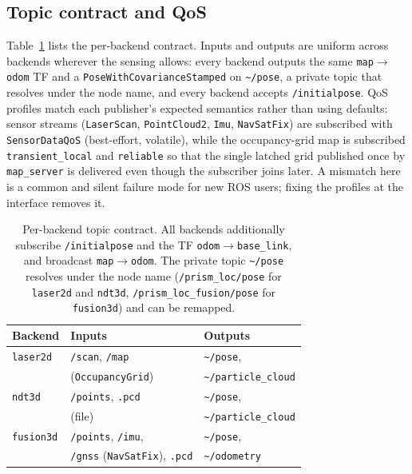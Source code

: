 \subsection{Topic contract and QoS}
Table~\ref{tab:contract} lists the per-backend contract. Inputs and
outputs are uniform across backends wherever the sensing allows: every
backend outputs the same \texttt{map}$\to$\texttt{odom} TF and a
\texttt{PoseWithCovarianceStamped} on \texttt{\textasciitilde/pose}, a
private topic that resolves under the node name, and every backend
accepts \texttt{/initialpose}. QoS profiles match
each publisher's expected semantics rather than using defaults: sensor
streams (\texttt{LaserScan}, \texttt{PointCloud2}, \texttt{Imu},
\texttt{NavSatFix}) are subscribed with \texttt{SensorDataQoS}
(best-effort, volatile), while the occupancy-grid map is subscribed
\texttt{transient\_local} and \texttt{reliable} so that the single
latched grid published once by \texttt{map\_server} is delivered even
though the subscriber joins later. A mismatch here is a common and
silent failure mode for new ROS users; fixing the profiles at the
interface removes it.

\begin{table}[t]
\centering
\caption{Per-backend topic contract. All backends additionally
subscribe \texttt{/initialpose} and the TF
\texttt{odom}$\to$\texttt{base\_link}, and broadcast
\texttt{map}$\to$\texttt{odom}. The private topic
\texttt{\textasciitilde/pose} resolves under the node name
(\texttt{/prism\_loc/pose} for \texttt{laser2d} and \texttt{ndt3d},
\texttt{/prism\_loc\_fusion/pose} for \texttt{fusion3d}) and can be
remapped.}
\label{tab:contract}
\small
\begin{tabular}{@{}lll@{}}
\toprule
Backend & Inputs & Outputs \\
\midrule
\texttt{laser2d} & \texttt{/scan}, \texttt{/map} & \texttt{\textasciitilde/pose}, \\
 & (\texttt{OccupancyGrid}) & \texttt{\textasciitilde/particle\_cloud} \\[2pt]
\texttt{ndt3d} & \texttt{/points}, \texttt{.pcd} & \texttt{\textasciitilde/pose}, \\
 & (file) & \texttt{\textasciitilde/particle\_cloud} \\[2pt]
\texttt{fusion3d} & \texttt{/points}, \texttt{/imu}, & \texttt{\textasciitilde/pose}, \\
 & \texttt{/gnss} (\texttt{NavSatFix}), \texttt{.pcd} & \texttt{\textasciitilde/odometry} \\
\bottomrule
\end{tabular}
\end{table}

